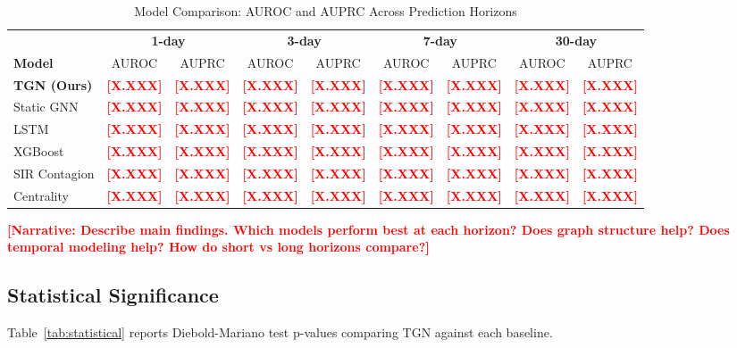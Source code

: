 \documentclass[journal]{IEEEtran}
\newcommand{\TODO}[1]{\textcolor{red}{\textbf{[#1]}}}
\begin{document}
\begin{table}[!t]
\caption{Model Comparison: AUROC and AUPRC Across Prediction Horizons}
\label{tab:main_results}
\centering
\begin{tabular}{l|cc|cc|cc|cc}
\toprule
& \multicolumn{2}{c|}{\textbf{1-day}} & \multicolumn{2}{c|}{\textbf{3-day}} & \multicolumn{2}{c|}{\textbf{7-day}} & \multicolumn{2}{c}{\textbf{30-day}} \\
\textbf{Model} & AUROC & AUPRC & AUROC & AUPRC & AUROC & AUPRC & AUROC & AUPRC \\
\midrule
\textbf{TGN (Ours)} & \TODO{X.XXX} & \TODO{X.XXX} & \TODO{X.XXX} & \TODO{X.XXX} & \TODO{X.XXX} & \TODO{X.XXX} & \TODO{X.XXX} & \TODO{X.XXX} \\
Static GNN & \TODO{X.XXX} & \TODO{X.XXX} & \TODO{X.XXX} & \TODO{X.XXX} & \TODO{X.XXX} & \TODO{X.XXX} & \TODO{X.XXX} & \TODO{X.XXX} \\
LSTM & \TODO{X.XXX} & \TODO{X.XXX} & \TODO{X.XXX} & \TODO{X.XXX} & \TODO{X.XXX} & \TODO{X.XXX} & \TODO{X.XXX} & \TODO{X.XXX} \\
XGBoost & \TODO{X.XXX} & \TODO{X.XXX} & \TODO{X.XXX} & \TODO{X.XXX} & \TODO{X.XXX} & \TODO{X.XXX} & \TODO{X.XXX} & \TODO{X.XXX} \\
SIR Contagion & \TODO{X.XXX} & \TODO{X.XXX} & \TODO{X.XXX} & \TODO{X.XXX} & \TODO{X.XXX} & \TODO{X.XXX} & \TODO{X.XXX} & \TODO{X.XXX} \\
Centrality & \TODO{X.XXX} & \TODO{X.XXX} & \TODO{X.XXX} & \TODO{X.XXX} & \TODO{X.XXX} & \TODO{X.XXX} & \TODO{X.XXX} & \TODO{X.XXX} \\
\bottomrule
\end{tabular}
\end{table}

\TODO{Narrative: Describe main findings. Which models perform best at each horizon? Does graph structure help? Does temporal modeling help? How do short vs long horizons compare?}

\subsection{Statistical Significance}

Table~\ref{tab:statistical} reports Diebold-Mariano test p-values comparing TGN against each baseline.
\end{document}

